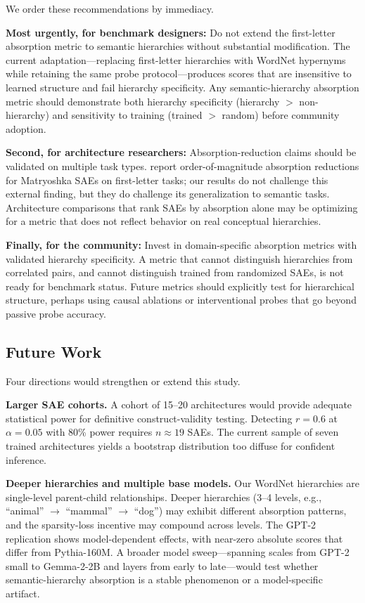 \documentclass{article}
\begin{document}
We order these recommendations by immediacy.

\textbf{Most urgently, for benchmark designers:} Do not extend the first-letter absorption metric to semantic hierarchies without substantial modification. The current adaptation---replacing first-letter hierarchies with WordNet hypernyms while retaining the same probe protocol---produces scores that are insensitive to learned structure and fail hierarchy specificity. Any semantic-hierarchy absorption metric should demonstrate both hierarchy specificity (hierarchy $>$ non-hierarchy) and sensitivity to training (trained $>$ random) before community adoption.

\textbf{Second, for architecture researchers:} Absorption-reduction claims should be validated on multiple task types. \citet{bussmann2025matryoshka} report order-of-magnitude absorption reductions for Matryoshka SAEs on first-letter tasks; our results do not challenge this external finding, but they do challenge its generalization to semantic tasks. Architecture comparisons that rank SAEs by absorption alone may be optimizing for a metric that does not reflect behavior on real conceptual hierarchies.

\textbf{Finally, for the community:} Invest in domain-specific absorption metrics with validated hierarchy specificity. A metric that cannot distinguish hierarchies from correlated pairs, and cannot distinguish trained from randomized SAEs, is not ready for benchmark status. Future metrics should explicitly test for hierarchical structure, perhaps using causal ablations or interventional probes that go beyond passive probe accuracy.

\subsection{Future Work}

Four directions would strengthen or extend this study.

\textbf{Larger SAE cohorts.} A cohort of 15--20 architectures would provide adequate statistical power for definitive construct-validity testing. Detecting $r = 0.6$ at $\alpha = 0.05$ with 80\% power requires $n \approx 19$ SAEs. The current sample of seven trained architectures yields a bootstrap distribution too diffuse for confident inference.

\textbf{Deeper hierarchies and multiple base models.} Our WordNet hierarchies are single-level parent-child relationships. Deeper hierarchies (3--4 levels, e.g., ``animal'' $\to$ ``mammal'' $\to$ ``dog'') may exhibit different absorption patterns, and the sparsity-loss incentive may compound across levels. The GPT-2 replication shows model-dependent effects, with near-zero absolute scores that differ from Pythia-160M. A broader model sweep---spanning scales from GPT-2 small to Gemma-2-2B and layers from early to late---would test whether semantic-hierarchy absorption is a stable phenomenon or a model-specific artifact.
\end{document}
